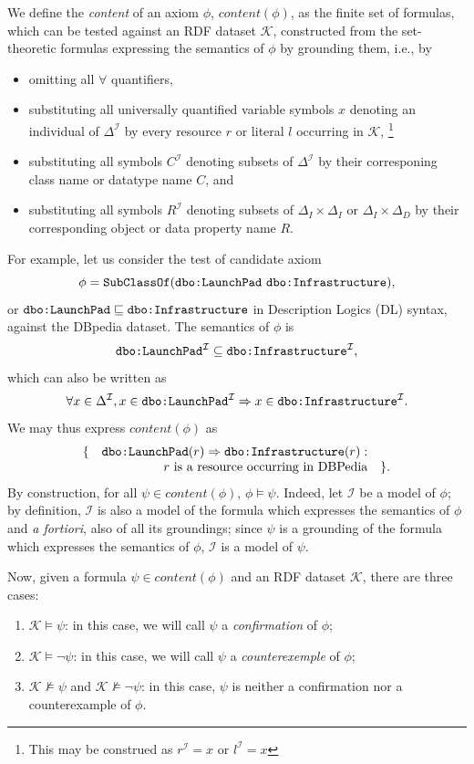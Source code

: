 \documentclass{sig-alternate}
\begin{document}
We define the \emph{content} of an axiom $\phi$, $content(\phi)$, as the finite set of formulas,
which can be tested against an RDF dataset $\mathcal{K}$,
constructed from the set-theoretic formulas expressing the semantics of $\phi$
by grounding them, i.e., by
\begin{itemize}
\item omitting all $\forall$ quantifiers,
\item substituting all universally quantified variable symbols $x$ denoting an individual
of $\Delta^\mathcal{I}$ by every resource $r$ or literal $l$ occurring in $\mathcal{K}$,%
\footnote{This may be construed as $r^\mathcal{I} = x$ or $l^\mathcal{I} = x$}
\item substituting all symbols $C^\mathcal{I}$ denoting subsets of $\Delta^\mathcal{I}$
by their corresponing class name or datatype name $C$, and
\item substituting all symbols $R^\mathcal{I}$ denoting subsets of $\Delta_{I}\times\Delta_{I}$ or $\Delta_{I}\times\Delta_{D}$
by their corresponding object or data property name $R$.
\end{itemize}
For example, let us consider the test of candidate axiom
\[
  \phi = \mbox{\texttt{SubClassOf}(\texttt{dbo:LaunchPad} \texttt{dbo:Infrastructure})},
\]
or $\mbox{\tt dbo:LaunchPad} \sqsubseteq \mbox{\tt dbo:Infrastructure}$
in Description Logics (DL) syntax, against the DBpedia dataset.
The semantics of $\phi$ is
\[
  \mbox{\texttt{dbo:LaunchPad}}^\mathcal{I} \subseteq \mbox{\texttt{dbo:Infrastructure}}^\mathcal{I},
\]
which can also be written as
\[
  \forall x \in \Delta^\mathcal{I},
  x \in \mbox{\texttt{dbo:LaunchPad}}^\mathcal{I} \Rightarrow x \in \mbox{\texttt{dbo:Infrastructure}}^\mathcal{I}.
\]
We may thus express $content(\phi)$ as
\[
  \begin{array}{rrl}
    \{ & \mbox{\tt dbo:LaunchPad}(r) \Rightarrow \mbox{\tt dbo:Infrastructure}(r) : &\\
       & \mbox{$r$ is a resource occurring in DBPedia} & \}.
  \end{array}
\]
By construction, for all $\psi \in content(\phi)$, $\phi \models \psi$.
Indeed, let $\mathcal{I}$ be a model of $\phi$;
by definition, $\mathcal{I}$ is also a model of the formula which expresses the semantics of $\phi$
and \emph{a fortiori}, also of all its groundings; since $\psi$ is a grounding of the
formula which expresses the semantics of $\phi$, $\mathcal{I}$ is a model of $\psi$.

Now, given a formula $\psi \in content(\phi)$ and an RDF dataset $\mathcal{K}$,
there are three cases:
\begin{enumerate}
\item $\mathcal{K} \models \psi$:
  in this case, we will call $\psi$ a \emph{confirmation} of $\phi$;
\item $\mathcal{K} \models \neg\psi$:
  in this case, we will call $\psi$ a \emph{counterexemple} of $\phi$;
\item $\mathcal{K} \not\models \psi$ and $\mathcal{K} \not\models \neg\psi$:
  in this case, $\psi$ is neither a confirmation nor a counterexample of $\phi$.
\end{enumerate}
\end{document}
